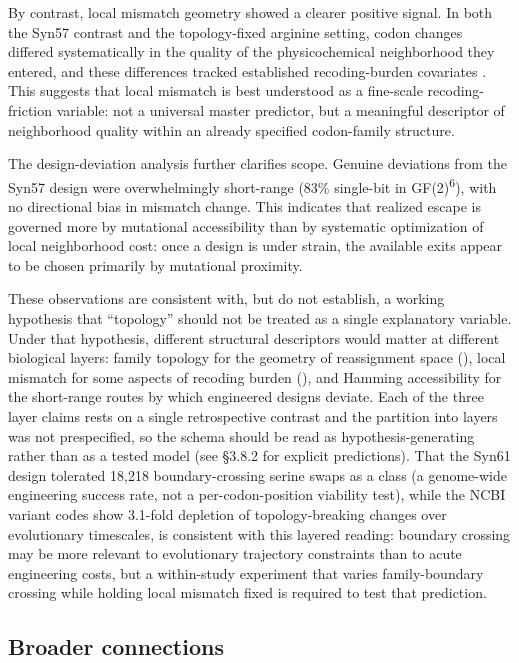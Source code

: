 \documentclass[preprint,11pt,authoryear,a4paper]{elsarticle}
\begin{document}
By contrast, local mismatch geometry showed a clearer positive signal.
In both the Syn57 contrast and the topology-fixed arginine setting,
codon changes differed systematically in the quality of the
physicochemical neighborhood they entered, and these differences tracked
established recoding-burden covariates \citep{napolitano2016}. This
suggests that local mismatch is best understood as a fine-scale
recoding-friction variable: not a universal master predictor, but a
meaningful descriptor of neighborhood quality within an already
specified codon-family structure.

The design-deviation analysis further clarifies scope. Genuine
deviations from the Syn57 design were overwhelmingly short-range (83\%
single-bit in GF(2)\textsuperscript{6}), with no directional bias in
mismatch change. This indicates that realized escape is governed more by
mutational accessibility than by systematic optimization of local
neighborhood cost: once a design is under strain, the available exits
appear to be chosen primarily by mutational proximity.

These observations are consistent with, but do not establish, a working
hypothesis that ``topology'' should not be treated as a single
explanatory variable. Under that hypothesis, different structural
descriptors would matter at different biological layers: family topology
for the geometry of reassignment space (), local
mismatch for some aspects of recoding burden
(), and Hamming accessibility for the
short-range routes by which engineered designs deviate. Each of the
three layer claims rests on a single retrospective contrast and the
partition into layers was not prespecified, so the schema should be read
as hypothesis-generating rather than as a tested model (see §3.8.2 for
explicit predictions). That the \citep{fredens2019} Syn61 design
tolerated 18,218 boundary-crossing serine swaps as a class (a
genome-wide engineering success rate, not a per-codon-position viability
test), while the NCBI variant codes show 3.1-fold depletion of
topology-breaking changes over evolutionary timescales, is consistent
with this layered reading: boundary crossing may be more relevant to
evolutionary trajectory constraints than to acute engineering costs, but
a within-study experiment that varies family-boundary crossing while
holding local mismatch fixed is required to test that prediction.

\subsection{Broader connections}\label{sec:disc-broader}
\end{document}
